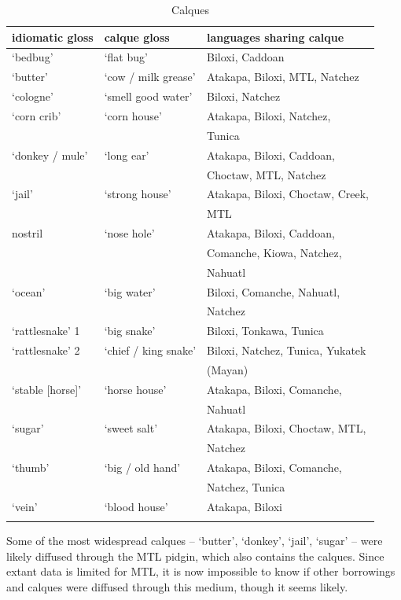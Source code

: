 \documentclass[output=paper]{LSP/langsci}
\begin{document}
\begin{table}
\caption{Calques} \label{calques}
\begin{tabular}{ lll }
\lsptoprule
 idiomatic gloss & calque gloss & languages sharing calque
\\ \midrule `bedbug' & `flat bug' & Biloxi, Caddoan
\\ `butter' & `cow / milk grease' & Atakapa, Biloxi, MTL, Natchez 
\\ `cologne' & `smell good water' & Biloxi, Natchez
\\ `corn crib' & `corn house' & Atakapa, Biloxi, Natchez, 
\\ & & Tunica 
\\ `donkey / mule' & `long ear' & Atakapa, Biloxi, Caddoan,  
\\ & & Choctaw, MTL, Natchez
\\ `jail' & `strong house' & Atakapa, Biloxi, Choctaw, Creek,  
\\ & & MTL 
\\ nostril & `nose hole' & Atakapa, Biloxi, Caddoan, 
\\ & & Comanche, Kiowa, Natchez, 
\\ & & Nahuatl
\\ `ocean' & `big water' & Biloxi, Comanche, Nahuatl, 
\\ & & Natchez 
\\ `rattlesnake' 1 & `big snake' & Biloxi, Tonkawa, Tunica 
\\ `rattlesnake' 2 & `chief / king snake' & Biloxi, Natchez, Tunica, Yukatek 
\\ & & (Mayan)
\\ `stable [horse]' & `horse house' & Atakapa, Biloxi, Comanche, 
\\ & & Nahuatl
\\ `sugar' & `sweet salt' & Atakapa, Biloxi, Choctaw, MTL, 
\\ & & Natchez 
\\ `thumb' & `big / old hand' & Atakapa, Biloxi, Comanche,  
\\ & & Natchez, Tunica 
\\ `vein' & `blood house' & Atakapa, Biloxi 
\\ \lspbottomrule
\end{tabular}\end{table}

	Some of the most widespread calques -- `butter', `donkey', `jail', `sugar' -- were likely diffused through the MTL pidgin, which also contains the calques. Since extant data is limited for MTL, it is now impossible to know if other borrowings and calques were diffused through this medium, though it seems likely.
\end{document}
